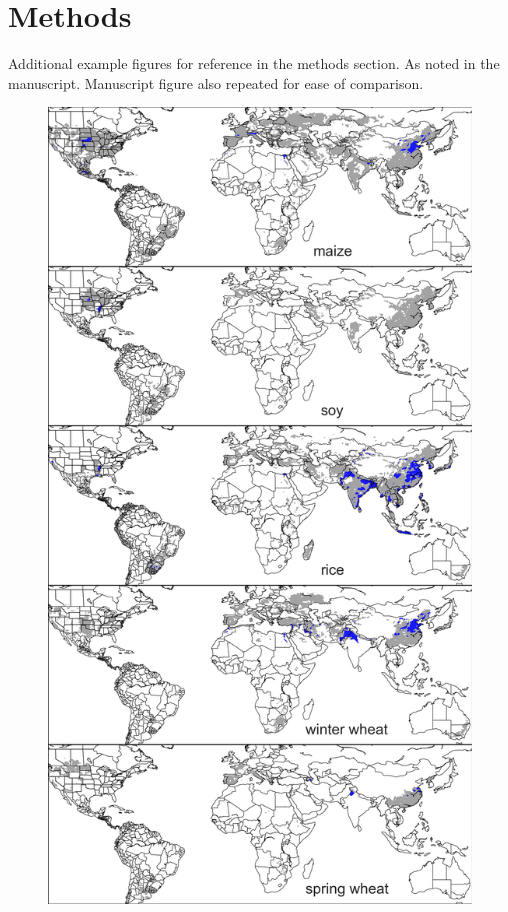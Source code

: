 \documentclass[10pt]{article}
\begin{document}
{\tableofcontents

\clearpage
\modulolinenumbers[1]
\linenumbers

\renewcommand{\thefigure}{S\arabic{figure}}

\section{Methods}
Additional example figures for reference in the methods section. As noted in the manuscript. Manuscript figure also repeated for ease of comparison.

\begin{figure}[h!]
\centering
\begin{minipage}{.45\textwidth}
    \centering
    \vspace{0pt}
    \includegraphics[width=\textwidth]{s_croparea_irr.png}\\

\end{minipage}
\end{figure}}
\end{document}
